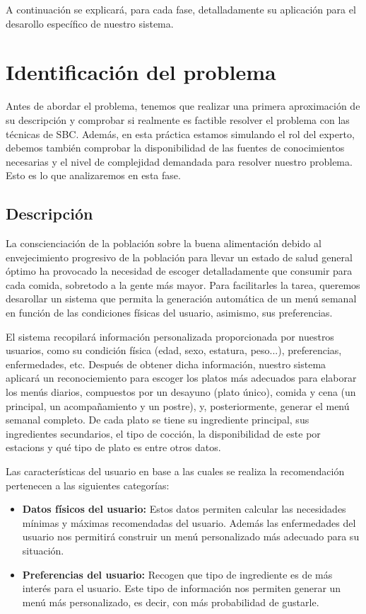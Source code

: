 \documentclass[11pt]{article}
\begin{document}
A continuación se explicará, para cada fase, detalladamente su aplicación para el desarollo específico de nuestro sistema.

\newpage
\section{Identificación del problema}

Antes de abordar el problema, tenemos que realizar una primera aproximación de su descripción y comprobar si realmente es factible resolver el problema con las técnicas de SBC. Además, en esta práctica estamos simulando el rol del experto, debemos también comprobar la disponibilidad de las fuentes de conocimientos necesarias y el nivel de complejidad demandada para resolver nuestro problema. Esto es lo que analizaremos en esta fase.

\subsection{Descripción}

La conscienciación de la población sobre la buena alimentación debido al envejecimiento progresivo de la población para llevar un estado de salud general óptimo ha provocado la necesidad de escoger detalladamente que consumir para cada comida, sobretodo a la gente más mayor. Para facilitarles la tarea, queremos desarollar un sistema que permita la generación automática de un menú semanal en función de las condiciones físicas del usuario, asimismo, sus preferencias.

El sistema recopilará información personalizada proporcionada por nuestros usuarios, como su condición física (edad, sexo, estatura, peso...), preferencias, enfermedades, etc. Después de obtener dicha información, nuestro sistema aplicará un reconociemiento para escoger los platos más adecuados para elaborar los menús diarios, compuestos por un desayuno (plato único), comida y cena (un principal, un acompañamiento y un postre), y, posteriormente, generar el menú semanal completo. De cada plato se tiene su ingrediente principal, sus ingredientes secundarios, el tipo de cocción, la disponibilidad de este por estacions y qué tipo de plato es entre otros datos. 

Las características del usuario en base a las cuales se realiza la recomendación pertenecen a las siguientes categorías:

\begin{itemize}
    \item \textbf{Datos físicos del usuario:} Estos datos permiten calcular las necesidades mínimas y máximas recomendadas del usuario. Además las enfermedades del usuario nos permitirá construir un menú personalizado más adecuado para su situación.
    \item \textbf{Preferencias del usuario:} Recogen que tipo de ingrediente es de más interés para el usuario. Este tipo de información nos permiten generar un menú más personalizado, es decir, con más probabilidad de gustarle.
\end{itemize}
\end{document}
